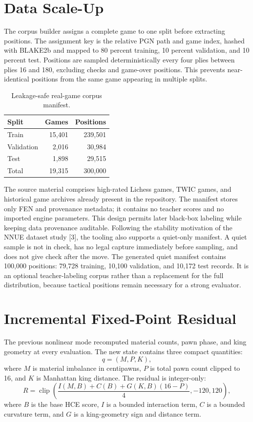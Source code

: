 \documentclass[conference]{IEEEtran}
\begin{document}
\section{Data Scale-Up}
The corpus builder assigns a complete game to one split before extracting positions. The assignment key is the relative PGN path and game index, hashed with BLAKE2b and mapped to 80 percent training, 10 percent validation, and 10 percent test. Positions are sampled deterministically every four plies between plies 16 and 180, excluding checks and game-over positions. This prevents near-identical positions from the same game appearing in multiple splits.

\begin{table}[t]
\centering
\caption{Leakage-safe real-game corpus manifest.}
\begin{tabular}{lrr}
\toprule
Split & Games & Positions \\
\midrule
Train & 15,401 & 239,501 \\
Validation & 2,016 & 30,984 \\
Test & 1,898 & 29,515 \\
\midrule
Total & 19,315 & 300,000 \\
\bottomrule
\end{tabular}
\end{table}

The source material comprises high-rated Lichess games, TWIC games, and historical game archives already present in the repository. The manifest stores only FEN and provenance metadata; it contains no teacher scores and no imported engine parameters. This design permits later black-box labeling while keeping data provenance auditable. Following the stability motivation of the NNUE dataset study [3], the tooling also supports a quiet-only manifest. A quiet sample is not in check, has no legal capture immediately before sampling, and does not give check after the move. The generated quiet manifest contains 100,000 positions: 79,728 training, 10,100 validation, and 10,172 test records. It is an optional teacher-labeling corpus rather than a replacement for the full distribution, because tactical positions remain necessary for a strong evaluator.

\section{Incremental Fixed-Point Residual}
The previous nonlinear mode recomputed material counts, pawn phase, and king geometry at every evaluation. The new state contains three compact quantities:
\begin{equation}
 q = (M, P, K),
\end{equation}
where $M$ is material imbalance in centipawns, $P$ is total pawn count clipped to 16, and $K$ is Manhattan king distance. The residual is integer-only:
\begin{equation}
 R = \operatorname{clip}\left(\frac{I(M,B)+C(B)+G(K,B)(16-P)}{4},-120,120\right),
\end{equation}
where $B$ is the base HCE score, $I$ is a bounded interaction term, $C$ is a bounded curvature term, and $G$ is a king-geometry sign and distance term.
\end{document}
